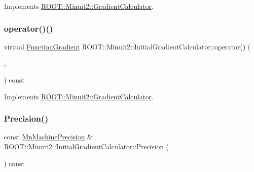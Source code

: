 Implements \mbox{\hyperlink{classROOT_1_1Minuit2_1_1GradientCalculator_a1809c1e8a89d32aabf7835e9690c2916}{R\+O\+O\+T\+::\+Minuit2\+::\+Gradient\+Calculator}}.

\mbox{\label{classROOT_1_1Minuit2_1_1InitialGradientCalculator_a673e891a98df0e4a4f71442ab61084bb}} 
\subsubsection{\texorpdfstring{operator()()}{operator()()}\hspace{0.1cm}{\footnotesize\ttfamily [4/4]}}
{\footnotesize\ttfamily virtual \mbox{\hyperlink{classROOT_1_1Minuit2_1_1FunctionGradient}{Function\+Gradient}} R\+O\+O\+T\+::\+Minuit2\+::\+Initial\+Gradient\+Calculator\+::operator() (\begin{DoxyParamCaption}\item[{const \mbox{\hyperlink{classROOT_1_1Minuit2_1_1MinimumParameters}{Minimum\+Parameters}} \&}]{,  }\item[{const \mbox{\hyperlink{classROOT_1_1Minuit2_1_1FunctionGradient}{Function\+Gradient}} \&}]{ }\end{DoxyParamCaption}) const\hspace{0.3cm}{\ttfamily [virtual]}}



Implements \mbox{\hyperlink{classROOT_1_1Minuit2_1_1GradientCalculator_a1809c1e8a89d32aabf7835e9690c2916}{R\+O\+O\+T\+::\+Minuit2\+::\+Gradient\+Calculator}}.

\mbox{\label{classROOT_1_1Minuit2_1_1InitialGradientCalculator_a7b85d42dfbb0581c4cb5f8ad47a798a0}} 
\subsubsection{\texorpdfstring{Precision()}{Precision()}\hspace{0.1cm}{\footnotesize\ttfamily [1/2]}}
{\footnotesize\ttfamily const \mbox{\hyperlink{classROOT_1_1Minuit2_1_1MnMachinePrecision}{Mn\+Machine\+Precision}} \& R\+O\+O\+T\+::\+Minuit2\+::\+Initial\+Gradient\+Calculator\+::\+Precision (\begin{DoxyParamCaption}{ }\end{DoxyParamCaption}) const}

